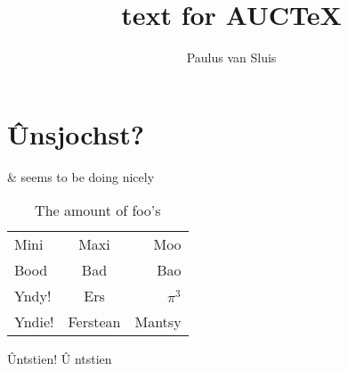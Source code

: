 \documentclass[a4paper]{memoir}
\title{text for AUC\TeX}
\author{Paulus van Sluis}
\begin{document}
\chapter{Ûnsjochst?}
\&   seems to be doing nicely

\begin{table}[h]
  \centering
  \begin{tabular}{lcr}\toprule
    Mini & Maxi & Moo\\
    Bood & Bad & Bao \\\midrule
    Yndy! & Ers & \(\pi^{3}\)\\
    Yndie! & Ferstean & Mantsy \\\bottomrule
  \end{tabular}
  \caption{The amount of foo's}
  \label{tab:foos}
\end{table}
Ûntstien! \^U%
ntstien

\autocite{harvey_aspects_1984}
\autocite{lewis_concise_1974}

\printbibliography
\end{document}
